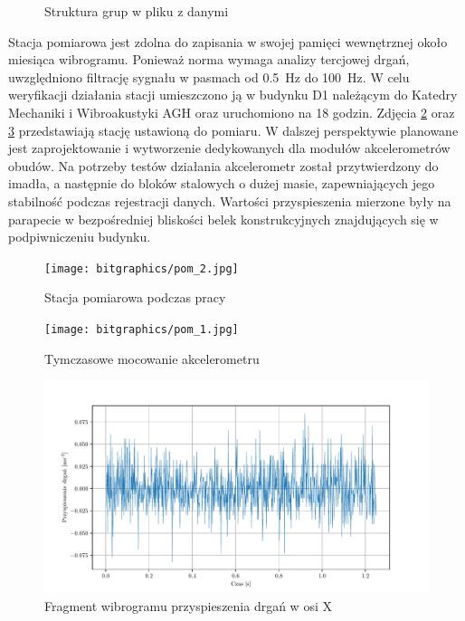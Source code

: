 \documentclass[a4paper,12pt]{mwart}
\begin{document}
\begin{figure}[!tbh]%
  \centering%
  \begin{minipage}{0.3\textwidth}%
  \end{minipage}%
  \caption{Struktura grup w pliku z danymi}%
  \label{fig:struc}%
\end{figure}%

Stacja pomiarowa jest zdolna do zapisania w swojej pamięci wewnętrznej około
miesiąca wibrogramu. Ponieważ norma wymaga analizy tercjowej drgań, uwzględniono
filtrację sygnału w pasmach od \SI{0,5}{\hertz} do \SI{100}{\hertz}. W celu
weryfikacji działania stacji umieszczono ją w budynku D1 należącym do Katedry
Mechaniki i Wibroakustyki AGH oraz uruchomiono na 18 godzin. Zdjęcia
\ref{fig:pomiar1} oraz \ref{fig:imadlo} przedstawiają stację ustawioną do
pomiaru. W dalszej perspektywie planowane jest zaprojektowanie i wytworzenie
dedykowanych dla modułów akcelerometrów obudów. Na potrzeby testów działania
akcelerometr został przytwierdzony do imadła, a następnie do bloków stalowych o
dużej masie, zapewniających jego stabilność podczas rejestracji danych. Wartości
przyspieszenia mierzone były na parapecie w bezpośredniej bliskości belek
konstrukcyjnych znajdujących się w podpiwniczeniu budynku.

\begin{figure}[!tbh]
  \centering
  \texttt{[image: bitgraphics/pom\_2.jpg]}
  \caption{Stacja pomiarowa podczas pracy}
  \label{fig:pomiar1}
\end{figure}

\begin{figure}[!tbh]
  \centering
  \texttt{[image: bitgraphics/pom\_1.jpg]}
  \caption{Tymczasowe mocowanie akcelerometru}
  \label{fig:imadlo}
\end{figure}

\begin{figure}[!tbh]
  \centering
  \includegraphics[width=\textwidth]{plots/accel_x.pdf}
  \caption{Fragment wibrogramu przyspieszenia drgań w osi X}
  \label{plot:accel_x}
\end{figure}
\end{document}
